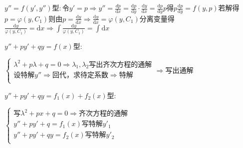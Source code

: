 \begin{spacing}{\hangju}
    $y''=f(y', y'')$型$\colon$令$y' = p \Rightarrow y'' = \frac{\mathrm{}{d}p}{\mathrm{d}x} = \frac{\mathrm{d}p}{\mathrm{d}y} \cdot \frac{\mathrm{d}y}{\mathrm{d}x} = \frac{\mathrm{d}p}{\mathrm{d}y}p$得$p\frac{\mathrm{d}p}{\mathrm{d}y} = f(y, p)$若解得$p = \varphi(y, C_1)$则由$p = \frac{\mathrm{d}y}{\mathrm{d}x} \Rightarrow \frac{\mathrm{d}y}{\mathrm{d}x} = \varphi(y, C_1)$分离变量得$\frac{\mathrm{d}y}{\varphi(y, C_1)} = \mathrm{d}x \Rightarrow \int{\frac{\mathrm{d}y}{\varphi(y, C_1)}} = \int\mathrm{d}x$

    $y'' + py' + qy = f(x)$型$\colon$

    $\begin{cases}
        \lambda^2 + p\lambda + q = 0 \Rightarrow \lambda_1, \lambda_2 \mbox{写出齐次方程的通解}\\
        \mbox{设特解}y'' \Rightarrow \mbox{回代，求待定系数} \Rightarrow \mbox{特解} \\
    \end{cases}
    \Rightarrow \mbox{写出通解}$

    $y'' + py' + qy = f_1(x) + f_2(x)$型$\colon$

    $\begin{cases}
        \mbox{写}\lambda^2 + px + q = 0 \Rightarrow \mbox{齐次方程的通解} \\
        y'' + py' + q = f_1(x) \mbox{写特解}y'_1 \\
        y'' + py' + qy = f_2(x) \mbox{写特解}y'_2 \\
    \end{cases}$
\end{spacing}